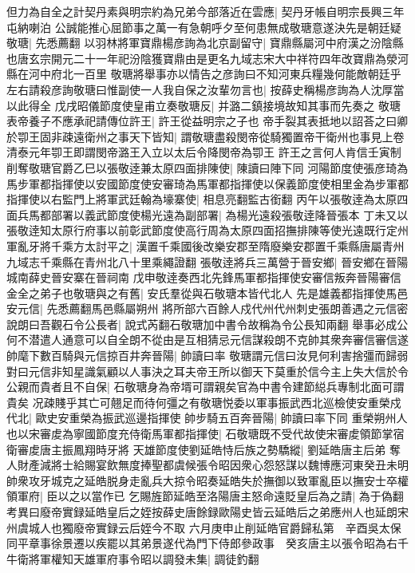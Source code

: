 但力為自全之計契丹素與明宗約為兄弟今部落近在雲應|{
	契丹牙帳自明宗長興三年屯納喇泊}
公誠能推心屈節事之萬一有急朝呼夕至何患無成敬瑭意遂決先是朝廷疑敬瑭|{
	先悉薦翻}
以羽林將軍寶鼎楊彦詢為北京副留守|{
	寶鼎縣屬河中府漢之汾陰縣也唐玄宗開元二十一年祀汾陰獲寶鼎由是更名九域志宋大中祥符四年改寶鼎為滎河縣在河中府北一百里}
敬瑭將舉事亦以情告之彦詢曰不知河東兵糧幾何能敵朝廷乎左右請殺彦詢敬瑭曰惟副使一人我自保之汝輩勿言也|{
	按薛史稱楊彦詢為人沈厚當以此得全}
戊戌昭儀節度使皇甫立奏敬瑭反|{
	并潞二鎮接境故知其事而先奏之}
敬瑭表帝養子不應承祀請傳位許王|{
	許王從益明宗之子也}
帝手裂其表抵地以詔荅之曰卿於卾王固非疎遠衛州之事天下皆知|{
	謂敬瑭盡殺閔帝從騎獨置帝干衛州也事見上卷清泰元年卾王即謂閔帝潞王入立以太后令降閔帝為卾王}
許王之言何人肯信壬寅制削奪敬瑭官爵乙巳以張敬逹兼太原四面排陳使|{
	陳讀曰陣下同}
河陽節度使張彦琦為馬步軍都指揮使以安國節度使安審琦為馬軍都指揮使以保義節度使相里金為步軍都指揮使以右監門上將軍武廷翰為壕寨使|{
	相息亮翻監古銜翻}
丙午以張敬逹為太原四面兵馬都部署以義武節度使楊光遠為副部署|{
	為楊光遠殺張敬逹降晉張本}
丁未又以張敬逹知太原行府事以前彰武節度使高行周為太原四面招撫排陳等使光遠既行定州軍亂牙將千乘方太討平之|{
	漢置千乘國後改樂安郡至隋廢樂安郡置千乘縣唐屬青州九域志千乘縣在青州北八十里乘繩證翻}
張敬逹將兵三萬營于晉安鄉|{
	晉安鄉在晉陽城南薛史晉安寨在晉祠南}
戊申敬逹奏西北先鋒馬軍都指揮使安審信叛奔晉陽審信金全之弟子也敬瑭與之有舊|{
	安氏羣從與石敬瑭本皆代北人}
先是雄義都指揮使馬邑安元信|{
	先悉薦翻馬邑縣屬朔州}
將所部六百餘人戍代州代州刺史張朗善遇之元信密說朗曰吾觀石令公長者|{
	說式芮翻石敬瑭加中書令故稱為令公長知兩翻}
舉事必成公何不潜遣人通意可以自全朗不從由是互相猜忌元信謀殺朗不克帥其衆奔審信審信遂帥麾下數百騎與元信掠百井奔晉陽|{
	帥讀曰率}
敬瑭謂元信曰汝見何利害捨彊而歸弱對曰元信非知星識氣顧以人事決之耳夫帝王所以御天下莫重於信今主上失大信於令公親而貴者且不自保|{
	石敬瑭身為帝壻可謂親矣官為中書令建節縂兵專制北面可謂貴矣}
况疎賤乎其亡可翹足而待何彊之有敬瑭悦委以軍事振武西北巡檢使安重榮戍代北|{
	歐史安重榮為振武巡邊指揮使}
帥步騎五百奔晉陽|{
	帥讀曰率下同}
重榮朔州人也以宋審䖍為寧國節度充侍衛馬軍都指揮使|{
	石敬瑭既不受代故使宋審䖍領節掌宿衛審䖍唐主振鳳翔時牙將}
天雄節度使劉延皓恃后族之勢驕縱|{
	劉延皓唐主后弟}
奪人財產減將士給賜宴飲無度捧聖都虞候張令昭因衆心怨怒謀以魏博應河東癸丑未明帥衆攻牙城克之延皓脱身走亂兵大掠令昭奏延皓失於撫御以致軍亂臣以撫安士卒權領軍府|{
	臣以之以當作已}
乞賜旌節延皓至洛陽唐主怒命遠貶皇后為之請|{
	為于偽翻　考異曰廢帝實録延皓皇后之姪按薛史唐餘録歐陽史皆云延皓后之弟應州人也延朗宋州虞城人也獨廢帝實録云后姪今不取}
六月庚申止削延皓官爵歸私第　辛酉吳太保同平章事徐景遷以疾罷以其弟景遂代為門下侍郎參政事　癸亥唐主以張令昭為右千牛衛將軍權知天雄軍府事令昭以調發未集|{
	調徒釣翻}
